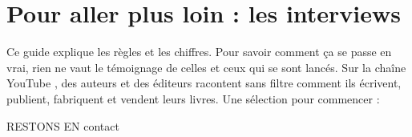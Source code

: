 \section{Pour aller plus loin : les interviews}

Ce guide explique les règles et les chiffres. Pour savoir comment ça se
passe en vrai, rien ne vaut le témoignage de celles et ceux qui se sont
lancés. Sur la chaîne YouTube \plMarque, des
auteurs et des éditeurs racontent sans filtre comment ils écrivent,
publient, fabriquent et vendent leurs livres. Une sélection pour
commencer :

\grilleinterviews

\clearpage
\vspace*{\fill}
{\centering\pltitre\fontsize{30}{34}\selectfont RESTONS EN
 {\placcent\color{plOrangeFonce}contact}\par}
\vspace{14pt}
\banniereyoutube
